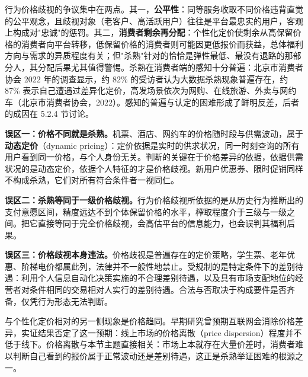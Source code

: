行为价格歧视的争议集中在两点。其一，\textbf{公平性}：同等服务收取不同价格违背直觉的公平观念，且歧视对象（老客户、高活跃用户）往往是平台最忠实的用户，客观上构成对"忠诚"的惩罚。其二，\textbf{消费者剩余再分配}：个性化定价使剩余从高保留价格的消费者向平台转移，低保留价格的消费者则可能因更低报价而获益，总体福利方向与需求的异质程度有关；但"杀熟"针对的恰恰是弹性最低、最没有退路的那部分人，其分配后果尤其值得警惕。杀熟在消费者端的感知十分普遍：北京市消费者协会 2022 年的调查显示，约 82\% 的受访者认为大数据杀熟现象普遍存在，约 87\% 表示自己遭遇过差异化定价，高发场景依次为网购、在线旅游、外卖与网约车（北京市消费者协会，2022）。感知的普遍与认定的困难形成了鲜明反差，后者的成因在 5.2.4 节讨论。

\begin{misconception}
\textbf{误区一：价格不同就是杀熟。}机票、酒店、网约车的价格随时段与供需波动，属于\textbf{动态定价}（dynamic pricing）：定价依据是实时的供求状况，同一时刻查询的所有用户看到同一价格，与个人身份无关。判断的关键在于价格差异的依据，依据供需状况的是动态定价，依据个人特征的才是价格歧视。新用户优惠券、限时促销同样不构成杀熟，它们对所有符合条件者一视同仁。

\textbf{误区二：杀熟等同于一级价格歧视。}行为价格歧视所依据的是从历史行为推断出的支付意愿区间，精度远达不到个体保留价格的水平，榨取程度介于三级与一级之间。把它直接等同于完全价格歧视，会高估平台的信息能力，也会误判其福利后果。

\textbf{误区三：价格歧视本身违法。}价格歧视是普遍存在的定价策略，学生票、老年优惠、阶梯电价都属此列，法律并不一般性地禁止。受规制的是特定条件下的差别待遇：利用个人信息自动化决策实施的不合理差别待遇，以及具有市场支配地位的经营者对条件相同的交易相对人实行的差别待遇。合法与否取决于构成要件是否齐备，仅凭行为形态无法判断。
\end{misconception}

与个性化定价相对的另一侧现象是价格趋同。早期研究曾预期互联网会消除价格差异，实证结果否定了这一预期：线上市场的价格离散（price dispersion）程度并不低于线下。价格离散与本节主题直接相关：市场上本就存在大量价差时，消费者难以判断自己看到的报价属于正常波动还是差别待遇，这正是杀熟举证困难的根源之一。

